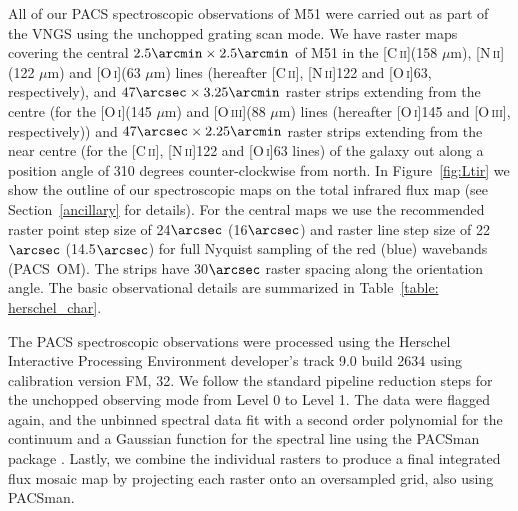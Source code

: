 \documentclass[preprint2]{aastex}
\begin{document}
All of our PACS spectroscopic observations of M51 were carried out as part of the VNGS using the unchopped grating scan mode.  We have raster maps covering the central $2.5\arcmin \times 2.5\arcmin$ of M51 in the [C\,\textsc{ii}](158 $\mu$m), [N\,\textsc{ii}](122 $\mu$m) and [O\,\textsc{i}](63 $\mu$m) lines (hereafter [C\,\textsc{ii}], [N\,\textsc{ii}]122 and [O\,\textsc{i}]63, respectively), and $47\arcsec \times 3.25\arcmin$ raster strips extending from the centre (for the [O\,\textsc{i}](145 $\mu$m) and [O\,\textsc{iii}](88 $\mu$m) lines (hereafter [O\,\textsc{i}]145 and [O\,\textsc{iii}], respectively)) and $47\arcsec \times 2.25\arcmin$ raster strips extending from the near centre (for the [C\,\textsc{ii}], [N\,\textsc{ii}]122 and [O\,\textsc{i}]63 lines) of the galaxy out along a position angle of 310 degrees counter-clockwise from north.   In Figure~\ref{fig:Ltir} we show the outline of our spectroscopic maps on the total infrared flux map (see Section~\ref{ancillary} for details).  For the central maps we use the recommended raster point step size of 24$\arcsec$ (16$\arcsec$) and raster line step size of 22$\arcsec$ (14.5$\arcsec$) for full Nyquist sampling of the red (blue) wavebands (PACS~OM).  The strips have 30$\arcsec$ raster spacing along the orientation angle.  The basic observational details are summarized in Table~\ref{table: herschel_char}.

The PACS spectroscopic observations were processed using the Herschel Interactive Processing Environment \citep[HIPE; ][]{2010ASPC..434..139O} developer's track 9.0 build 2634 using calibration version FM, 32.  We follow the standard pipeline reduction steps for the unchopped observing mode from Level 0 to Level 1. The data were flagged again, and the unbinned spectral data fit with a second order polynomial for the continuum and a Gaussian function for the spectral line using the PACSman package \citep{2012A&A...548A..91L}.  Lastly, we combine the individual rasters to produce a final integrated flux mosaic map by projecting each raster onto an oversampled grid, also using PACSman.
\end{document}
